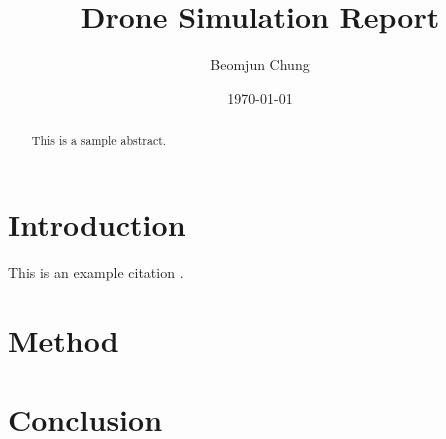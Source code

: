 \documentclass[a4paper,11pt]{article}
\title{Drone Simulation Report}
\author{Beomjun Chung}
\date{\today}
\begin{document}
    \maketitle

    \begin{abstract}
    This is a sample abstract.
    \end{abstract}

    \section{Introduction}
    This is an example citation \cite{smith2023}.

    \section{Method}

    \section{Conclusion}
    

    
    
\end{document}
